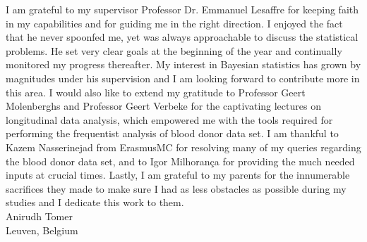 I am grateful to my supervisor Professor Dr. Emmanuel Lesaffre for keeping faith in my capabilities and for guiding me in the right direction. I enjoyed the fact that he never spoonfed me, yet was always approachable to discuss the statistical problems. He set very clear goals at the beginning of the year and continually monitored my progress thereafter. My interest in Bayesian statistics has grown by magnitudes under his supervision and I am looking forward to contribute more in this area. I would also like to extend my gratitude to Professor Geert Molenberghs and Professor Geert Verbeke for the captivating lectures on longitudinal data analysis, which empowered me with the tools required for performing the frequentist analysis of blood donor data set. I am thankful to Kazem Nasserinejad from ErasmusMC for resolving many of my queries regarding the blood donor data set, and to Igor Milhorança for providing the much needed inputs at crucial times. Lastly, I am grateful to my parents for the innumerable sacrifices they made to make sure I had as less obstacles as possible during my studies and I dedicate this work to them.\\

Anirudh Tomer\\
Leuven, Belgium